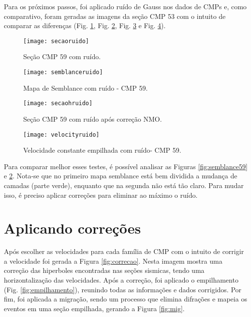 Para os próximos passos, foi aplicado ruído de Gauss nos dados de CMPs e, como comparativo, foram geradas as imagens da seção CMP 53 com o intuito de comparar as diferenças (Fig. \ref{fig:secaoruido}, Fig. \ref{fig:semblanceruido}, Fig. \ref{fig:secaohruido} e Fig. \ref{fig:velocityruido}).

\begin{figure}[ht!]
	\centering
	\texttt{[image: secaoruido]}
	\caption{Seção CMP 59 com ruído.} \label{fig:secaoruido}
\end{figure} 

\begin{figure}[ht!]
	\centering
	\texttt{[image: semblanceruido]}
	\caption{Mapa de Semblance com ruído - CMP 59.} \label{fig:semblanceruido}
\end{figure}

\begin{figure}[ht!]
	\centering
	\texttt{[image: secaohruido]}
	\caption{Seção CMP 59  com ruído após correção NMO.} \label{fig:secaohruido}
\end{figure}

\begin{figure}[ht!]
	\centering
	\texttt{[image: velocityruido]}
	\caption{Velocidade constante empilhada com ruído- CMP 59.} \label{fig:velocityruido}
\end{figure}

Para comparar melhor esses testes, é possível analisar as Figuras \ref{fig:semblance59} e \ref{fig:semblanceruido}. Nota-se que no primeiro mapa semblance está bem dividida a mudança de camadas (parte verde), enquanto que na segunda não está tão claro. Para mudar isso, é preciso aplicar correções para eliminar ao máximo o ruído. 

\section{Aplicando correções} 

Após escolher as velocidades para cada família de CMP com o intuito de corrigir a velocidade foi gerada a Figura \ref{fig:correcao}. Nesta imagem mostra uma correção das hiperboles encontradas nas seções sismicas, tendo uma horizontalização das velocidades. Após a correção, foi aplicado o empilhamento (Fig. \ref{fig:empilhamento}), reunindo todas as informações e dados corrigidos. Por fim, foi aplicada a migração, sendo um processo  que elimina difrações e mapeia os eventos em uma seção empilhada, gerando a Figura \ref{fig:mig}.


